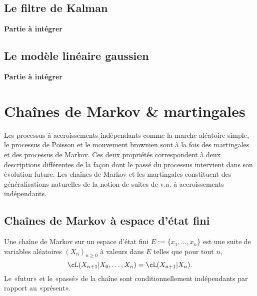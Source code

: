 {{%
\section{Le filtre de Kalman}
%


\textbf{Partie à intégrer}

%
\section{Le modèle linéaire gaussien}
%


\textbf{Partie à intégrer}

%
%
\chapter{Chaînes de Markov \& martingales}
\label{ch:markmart}
%
%

Les processus à accroissements indépendants comme la marche aléatoire simple,
le processus de Poisson et le mouvement brownien sont à la fois des
martingales et des processus de Markov. Ces deux propriétés correspondent à
deux descriptions différentes de la façon dont le passé du processus
intervient dans son évolution future. Les chaînes de Markov et les martingales
constituent des généralisations naturelles de la notion de suites de v.a. à
accroissements indépendants.

%
\section{Chaînes de Markov à espace d'état fini}
\label{se:chaines2marov}
% 
       
Une chaîne de Markov sur un espace d'état fini $E:=\{x_1,\ldots,x_n\}$ est une suite
de variables aléatoires $(X_n)_{n\geq 0}$ à valeurs dans $E$ telles que pour tout
$n$,
$$
\cL(X_{n+1}\vert X_0,\ldots,X_n) = \cL(X_{n+1} \vert X_n).
$$
Le «futur» et le «passé» de la chaîne sont conditionnellement
indépendants par rapport au «présent».

}}
